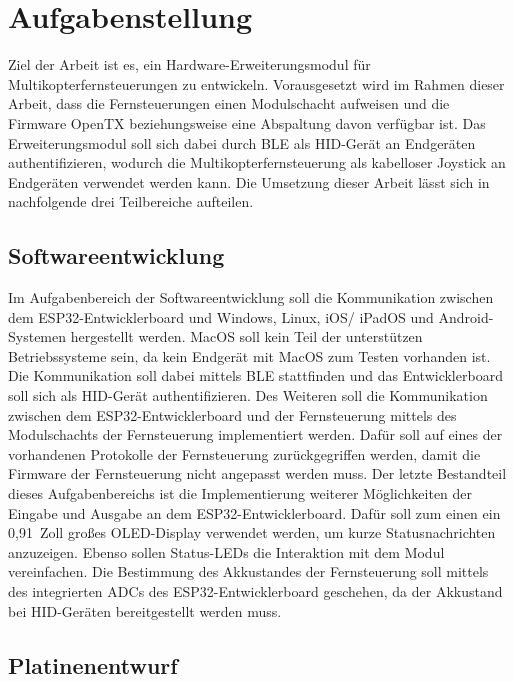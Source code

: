 
\chapter{Aufgabenstellung}
\label{section:Aufgabenstellung}

Ziel der Arbeit ist es, ein Hardware-Erweiterungsmodul für Multikopterfernsteuerungen zu entwickeln. Vorausgesetzt wird im Rahmen dieser Arbeit, dass die Fernsteuerungen einen Modulschacht aufweisen und die Firmware OpenTX \cite{opentxMain} beziehungsweise eine Abspaltung davon verfügbar ist. Das Erweiterungsmodul soll sich dabei durch \acs{BLE} als \acs{HID}-Gerät an Endgeräten authentifizieren, wodurch die Multikopterfernsteuerung als kabelloser Joystick an Endgeräten verwendet werden kann. Die Umsetzung dieser Arbeit lässt sich in nachfolgende drei Teilbereiche aufteilen.

\section{Softwareentwicklung}
\label{section:softwareRequirement}
Im Aufgabenbereich der Softwareentwicklung soll die Kommunikation zwischen dem ESP32-Entwicklerboard und Windows, Linux, iOS/ iPadOS und Android-Systemen hergestellt werden. MacOS soll kein Teil der unterstützen Betriebssysteme sein, da kein Endgerät mit MacOS zum Testen vorhanden ist. Die Kommunikation soll dabei mittels \acs{BLE} stattfinden und das Entwicklerboard soll sich als \acs{HID}-Gerät authentifizieren. Des Weiteren soll die Kommunikation zwischen dem ESP32-Entwicklerboard und der Fernsteuerung mittels des Modulschachts der Fernsteuerung implementiert werden. Dafür soll auf eines der vorhandenen Protokolle der Fernsteuerung zurückgegriffen werden, damit die Firmware der Fernsteuerung nicht angepasst werden muss. Der letzte Bestandteil dieses Aufgabenbereichs ist die Implementierung weiterer Möglichkeiten der Eingabe und Ausgabe an dem ESP32-Entwicklerboard. Dafür soll zum einen ein 0,91~Zoll großes \acs{OLED}-Display verwendet werden, um kurze Statusnachrichten anzuzeigen. Ebenso sollen Status-\acs{LED}s die Interaktion mit dem Modul vereinfachen. Die Bestimmung des Akkustandes der Fernsteuerung soll mittels des integrierten \acp{ADC} des ESP32-Entwicklerboard geschehen, da der Akkustand bei \acs{HID}-Geräten bereitgestellt werden muss.

\section{Platinenentwurf}

